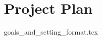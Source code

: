 \documentclass{article}
\begin{document}

\section*{Project Plan}

{goals_and_setting_format.tex}



\end{document}
